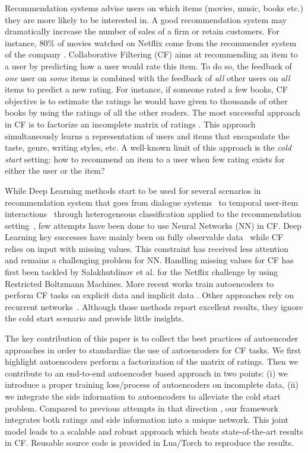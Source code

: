 \documentclass{article}
\begin{document}
Recommendation systems advise users on which items (movies, music, books etc.) they are more likely to be interested in. A good recommendation system may dramatically increase the number of sales of a firm or retain customers. For instance, 80\% of movies watched on Netflix come from the recommender system of the company \cite{Netflix2015}. Collaborative Filtering (CF) aims at recommending an item to a user by predicting how a user would rate this item. To do so, the feedback of \emph{one} user on \emph{some} items is combined with the feedback of \emph{all} other users on \emph{all} items to predict a new rating. For instance, if someone rated a few books, CF objective is to estimate the ratings he would have given to thousands of other books by using the ratings of all the other readers.
The most successful approach in CF is to factorize an incomplete matrix of ratings \cite{Koren2009,Zhou2008}. This approach simultaneously learns a representation of users and items that encapsulate the taste, genre, writing styles, etc.
A well-known limit of this approach is the \emph{cold start} setting: how to recommend an item to a user when few rating exists for either the user or the item?

While Deep Learning methods start to be used for several scenarios in recommendation system that goes from dialogue systems~\cite{wen2016network} to temporal user-item interactions~\cite{dai2016recurrent} through heterogeneous classification applied to the recommendation setting~\cite{cheng2016wide}, few attempts have been done to use Neural Networks (NN) in CF. Deep Learning key successes have mainly been on fully observable data~\cite{Lecun2015} while CF relies on input with missing values. This constraint has received less attention and remains a challenging problem for NN.
Handling missing values for CF has first been tackled by Salakhutdinov et al. \cite{Salakhutdinov2007} for the Netflix challenge by using Restricted Boltzmann Machines. More recent works train autoencoders to perform CF tasks on explicit data \cite{Sedhain2015,Strub2015} and implicit data \cite{Zheng2016}. Other approaches rely on recurrent networks~\cite{Wang2016collaborative}. Although those methods report excellent results, they ignore the cold start scenario and provide little insights.

The key contribution of this paper is to collect the best practices of autoencoder approaches in order to standardize the use of autoencoders for CF tasks.
We first highlight autoencoders perform a factorization of the matrix of ratings.
Then we contribute to an end-to-end autoencoder based approach in two points: (i) we introduce a proper training loss/process of autoencoders on incomplete data, (ii) we integrate the side information to autoencoders to alleviate the cold start problem. 
Compared to previous attempts in that direction \cite{Salakhutdinov2007,Sedhain2015,Wu2016}, our framework integrates both ratings and side information into a unique network. This joint model leads to a scalable and robust approach which beats state-of-the-art results in CF.
Reusable source code is provided in Lua/Torch to reproduce the results.
\end{document}
